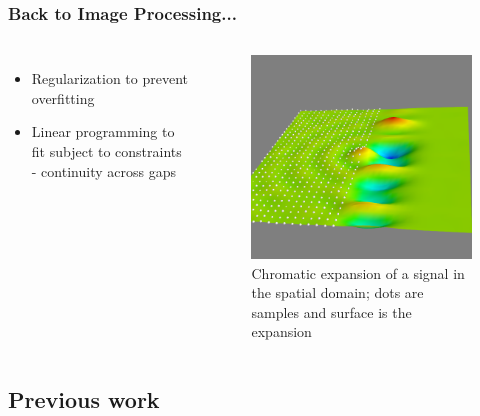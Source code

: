 \documentclass{beamer}
\begin{document}

\begin{frame}
\frametitle{Back to Image Processing...}

\begin{columns}[c]
\begin{itemize}
	\item Regularization to prevent overfitting
	\item Linear programming to fit subject to constraints - 
		continuity across gaps
\end{itemize}
\begin{figure} %
\centering
	\includegraphics[width=\columnwidth]{../figures/31x16bump.png}
\caption{Chromatic expansion of a signal in the spatial domain; 
dots are samples and surface is the expansion}
\end{figure}
\end{columns}

\end{frame}


\subsection{Previous work}
\end{document}
